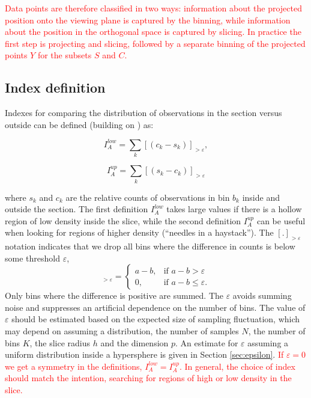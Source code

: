 \documentclass[]{interact}
\theoremstyle{plain}%
\theoremstyle{definition}
\theoremstyle{remark}
\begin{document}
\textcolor{red}{Data points are therefore classified in two ways: information about the projected position onto the viewing plane is captured by the binning, while information about the position in the orthogonal space is captured by slicing. In practice the first step is projecting and slicing, followed by a separate binning of the projected points $Y$ for the subsets $S$ and $C$.}

\hypertarget{index-definition}{%
\subsection{Index definition}\label{index-definition}}

Indexes for comparing the distribution of observations in the section
versus outside can be defined (building on
\citet{doi:10.1198/1061860043119}) as:

\begin{equation}
I_A^{low} = \sum_{k}\left[\left(c_{k}-s_{k}\right)\right]_{>\varepsilon},
\label{eq:index}
\end{equation}

\begin{equation}
I_A^{up} = \sum_{k}\left[\left(s_{k}-c_{k}\right)\right]_{>\varepsilon}
\label{eq:indexup}
\end{equation}

\noindent where \(s_{k}\) and \(c_{k}\) are the relative counts of
observations in bin \(b_{k}\) inside and outside the section. The first
definition \(I_A^{low}\) takes large values if there is a hollow region
of low density inside the slice, while the second definition
\(I_A^{up}\) can be useful when looking for regions of higher density
(``needles in a haystack''). The \([.]_{>\varepsilon}\) notation
indicates that we drop all bins where the difference in counts is below
some threshold \(\varepsilon\), \begin{equation}
[a - b]_{>\varepsilon} = \begin{cases}
    a - b, & \text{if $a - b > \varepsilon$}\\
    0, & \text{if $a-b \leq \varepsilon$.}
  \end{cases}
\end{equation} Only bins where the difference is positive are summed.
The \(\varepsilon\) avoids summing noise and suppresses an artificial
dependence on the number of bins. The value of \(\varepsilon\) should be
estimated based on the expected size of sampling fluctuation, which may
depend on assuming a distribution, the number of samples \(N\), the
number of bins \(K\), the slice radius \(h\) and the dimension \(p\). An
estimate for \(\varepsilon\) assuming a uniform distribution inside a
hypersphere is given in Section \ref{sec:epsilon}.
\textcolor{red}{If $\varepsilon=0$ we get a symmetry in the definitions,  $I_A^{low}=I_A^{up}$. In general, the choice of index should match the intention, searching for regions of high or low density in the slice.}
\end{document}
